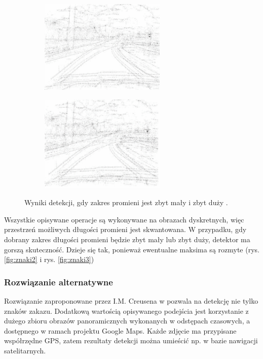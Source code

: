 \begin{figure}[h]
	\centering
	\begin{subfigure}{0.35\textwidth}
		\centering
		\includegraphics[width=6cm]{img/znaki2.png}
		\subcaption{\label{fig:znaki2}}
	\end{subfigure}
	\begin{subfigure}{0.35\textwidth}
		\centering
		\includegraphics[width=6cm]{img/znaki3.png}
		\subcaption{\label{fig:znaki3}}
	\end{subfigure}
	
	\caption{\label{fig:details}Wyniki detekcji, gdy zakres promieni jest zbyt mały \protect{} i zbyt duży \protect{}.\cite{T2}}
\end{figure}

Wszystkie opisywane operacje są wykonywane na obrazach dyskretnych, więc przestrzeń możliwych długości promieni jest skwantowana. 
W przypadku, gdy dobrany zakres długości promieni będzie zbyt mały lub zbyt duży, detektor ma gorszą skuteczność. 
Dzieje się tak, ponieważ ewentualne maksima są rozmyte (rys. \ref{fig:znaki2} i rys. \ref{fig:znaki3})

\subsubsection{Rozwiązanie alternatywne}

Rozwiązanie zaproponowane przez I.M. Creusena w \cite{T7} pozwala na detekcję nie tylko znaków zakazu. 
Dodatkową wartością opisywanego podejścia jest korzystanie z dużego zbioru obrazów panoramicznych wykonanych w odstępach czasowych, a dostępnego w ramach projektu Google Maps. 
Każde zdjęcie ma  przypisane współrzędne GPS, zatem rezultaty detekcji można umieścić np. w bazie nawigacji satelitarnych.

